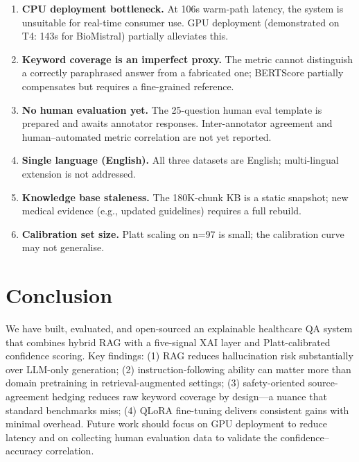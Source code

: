 \documentclass[10pt,twocolumn]{article}
\begin{document}
\begin{enumerate}[noitemsep]
  \item \textbf{CPU deployment bottleneck.} At 106s warm-path latency,
        the system is unsuitable for real-time consumer use.  GPU deployment
        (demonstrated on T4: 143s for BioMistral) partially alleviates this.
  \item \textbf{Keyword coverage is an imperfect proxy.} The metric cannot
        distinguish a correctly paraphrased answer from a fabricated one;
        BERTScore partially compensates but requires a fine-grained reference.
  \item \textbf{No human evaluation yet.} The 25-question human eval template
        is prepared and awaits annotator responses.  Inter-annotator agreement
        and human--automated metric correlation are not yet reported.
  \item \textbf{Single language (English).} All three datasets are English;
        multi-lingual extension is not addressed.
  \item \textbf{Knowledge base staleness.} The 180K-chunk KB is a static
        snapshot; new medical evidence (e.g., updated guidelines) requires
        a full rebuild.
  \item \textbf{Calibration set size.} Platt scaling on n=97 is small;
        the calibration curve may not generalise.
\end{enumerate}

\section{Conclusion}
\label{sec:conclusion}

We have built, evaluated, and open-sourced an explainable healthcare QA system
that combines hybrid RAG with a five-signal XAI layer and Platt-calibrated
confidence scoring.  Key findings: (1) RAG reduces hallucination risk
substantially over LLM-only generation; (2) instruction-following ability
can matter more than domain pretraining in retrieval-augmented settings;
(3) safety-oriented source-agreement hedging reduces raw keyword coverage by
design---a nuance that standard benchmarks miss; (4) QLoRA fine-tuning
delivers consistent gains with minimal overhead.  Future work should focus
on GPU deployment to reduce latency and on collecting human evaluation data
to validate the confidence--accuracy correlation.
\end{document}
